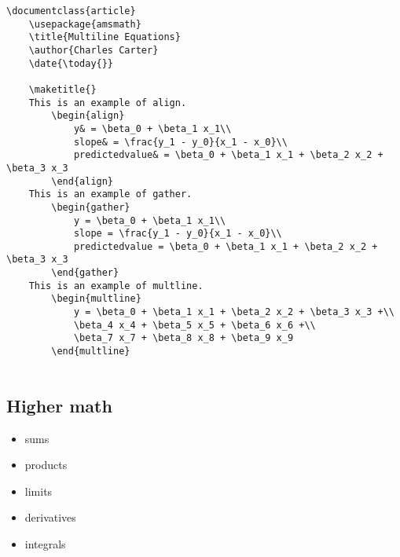 		\begin{verbatim}
\documentclass{article}
	\usepackage{amsmath}
    \title{Multiline Equations}
    \author{Charles Carter}
    \date{\today{}}
 
    \maketitle{}
	This is an example of align.
		\begin{align}
			y& = \beta_0 + \beta_1 x_1\\
			slope& = \frac{y_1 - y_0}{x_1 - x_0}\\
			predictedvalue& = \beta_0 + \beta_1 x_1 + \beta_2 x_2 + \beta_3 x_3
		\end{align}
	This is an example of gather.
		\begin{gather}
			y = \beta_0 + \beta_1 x_1\\
			slope = \frac{y_1 - y_0}{x_1 - x_0}\\
			predictedvalue = \beta_0 + \beta_1 x_1 + \beta_2 x_2 + \beta_3 x_3
		\end{gather}
	This is an example of multline.
		\begin{multline}
			y = \beta_0 + \beta_1 x_1 + \beta_2 x_2 + \beta_3 x_3 +\\
			\beta_4 x_4 + \beta_5 x_5 + \beta_6 x_6 +\\
			\beta_7 x_7 + \beta_8 x_8 + \beta_9 x_9
		\end{multline}
	    
        \end{verbatim}

        \subsection{Higher math}
        \label{Higher math}
        
        \begin{cmd}
            \begin{itemize}
                \item{sums}
                \item{products}
                \item{limits}
                \item{derivatives}
                \item{integrals}
            \end{itemize}
        \end{cmd}

